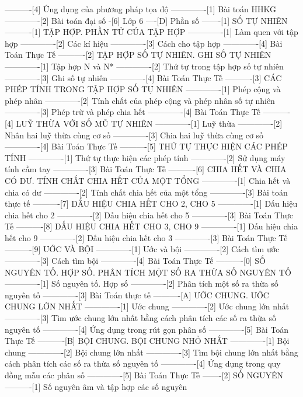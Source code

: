 ----------[4] Ứng dụng của phương pháp tọa độ
-------------[1] Bài toán HHKG
-------------[2] Bài toán đại số
-[6] Lớp 6
----[D] Phần số
-------[1] SỐ TỰ NHIÊN
----------[1] TẬP HỢP. PHẦN TỬ CỦA TẬP HỢP
-------------[1] Làm quen với tập hợp
-------------[2] Các kí hiệu
-------------[3] Cách cho tập hợp
-------------[4] Bài Toán Thực Tế
----------[2] TẬP HỢP SỐ TỰ NHIÊN. GHI SỐ TỰ NHIÊN
-------------[1] Tập hợp N và N*
-------------[2] Thứ tự trong tập hợp số tự nhiên
-------------[3] Ghi số tự nhiên
-------------[4] Bài Toán Thực Tế
----------[3] CÁC PHÉP TÍNH TRONG TẬP HỢP SỐ TỰ NHIÊN
-------------[1] Phép cộng và phép nhân
-------------[2] Tính chất của phép cộng và phép nhân số tự nhiên
-------------[3] Phép trừ và phép chia hết
-------------[4] Bài Toán Thực Tế
----------[4] LUỸ THỪA VỚI SỐ MŨ TỰ NHIÊN
-------------[1] Luỹ thừa
-------------[2] Nhân hai luỹ thừa cùng cơ số
-------------[3] Chia hai luỹ thừa cùng cơ số
-------------[4] Bài Toán Thực Tế
----------[5] THỨ TỰ THỰC HIỆN CÁC PHÉP TÍNH
-------------[1] Thứ tự thực hiện các phép tính
-------------[2] Sử dụng máy tính cầm tay
-------------[3] Bài Toán Thực Tế
----------[6] CHIA HẾT VÀ CHIA CÓ DƯ. TÍNH CHẤT CHIA HẾT CỦA MỘT TỔNG
-------------[1] Chia hết và chia có dư
-------------[2] Tính chất chia hết của một tổng
-------------[3] Bài toán thực tế
----------[7] DẤU HIỆU CHIA HẾT CHO 2, CHO 5
-------------[1] Dấu hiệu chia hết cho 2
-------------[2] Dấu hiệu chia hết cho 5
-------------[3] Bài Toán Thực Tế
----------[8] DẤU HIỆU CHIA HẾT CHO 3, CHO 9
-------------[1] Dấu hiệu chia hết cho 9
-------------[2] Dấu hiệu chia hết cho 3
-------------[3] Bài Toán Thực Tế
----------[9] ƯỚC VÀ BỘI
-------------[1] Ước và bội
-------------[2] Cách tìm ước
-------------[3] Cách tìm bội
-------------[4] Bài Toán Thực Tế
----------[0] SỐ NGUYÊN TỐ. HỢP SỐ. PHÂN TÍCH MỘT SỐ RA THỪA SỐ NGUYÊN TỐ
-------------[1] Số nguyên tố. Hợp số
-------------[2] Phân tích một số ra thừa số nguyên tố
-------------[3] Bài Toán thực tế
----------[A] ƯỚC CHUNG. ƯỚC CHUNG LỚN NHẤT
-------------[1] Ước chung
-------------[2] Ước chung lớn nhất
-------------[3] Tìm ước chung lớn nhất bằng cách phân tích các số ra thừa số nguyên tố
-------------[4] Ứng dụng trong rút gọn phân số
-------------[5] Bài Toán Thực Tế
----------[B] BỘI CHUNG. BỘI CHUNG NHỎ NHẤT
-------------[1] Bội chung
-------------[2] Bội chung lớn nhất
-------------[3] Tìm bội chung lớn nhất bằng cách phân tích các số ra thừa số nguyên tố
-------------[4] Ứng dụng trong quy đồng mẫu các phân số
-------------[5] Bài Toán Thực Tế
-------[2] SỐ NGUYÊN
----------[1] Số nguyên âm và tập hợp các số nguyên
